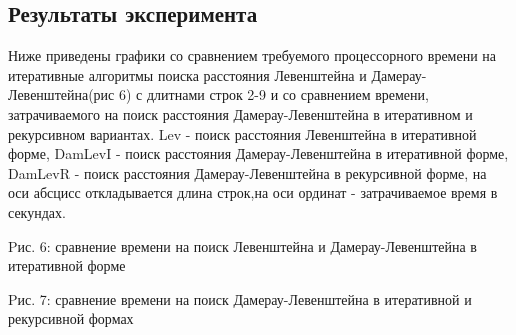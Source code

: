 \documentclass[a4paper, 14pt]{article}
\begin{document}
\begin{center}
\begin{flushleft}
\begin{center}
		\subsection{Результаты эксперимента}		
		\begin{flushleft}
		Ниже приведены графики со сравнением требуемого процессорного времени на итеративные алгоритмы поиска расстояния Левенштейна и Дамерау-Левенштейна(рис 6) с длитнами строк 2-9 и со сравнением времени, затрачиваемого на поиск расстояния Дамерау-Левенштейна в итеративном и рекурсивном вариантах.	Lev - поиск расстояния  Левенштейна в итеративной форме,		DamLevI - поиск расстояния Дамерау-Левенштейна в итеративной форме,
		DamLevR - поиск расстояния Дамерау-Левенштейна в рекурсивной форме,
		на оси абсцисс откладывается длина строк,на оси ординат - затрачиваемое время в секундах. 
				\end{flushleft}
\begin{center}
Pис. 6: сравнение времени на поиск Левенштейна и Дамерау-Левенштейна в итеративной форме
\end{center}

\begin{center}
Pис. 7: сравнение времени на поиск Дамерау-Левенштейна в итеративной и рекурсивной формах
\end{center}
\begin{center}
        

\end{center}
\end{center}
\end{flushleft}
\end{center}
\end{document}
